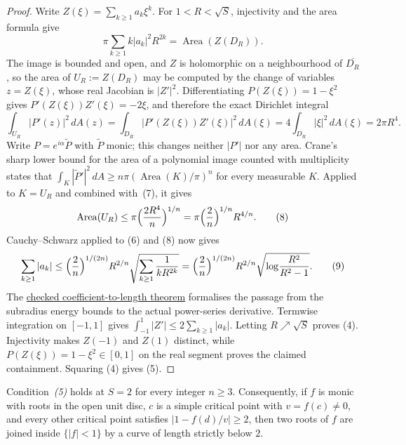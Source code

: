\documentclass[11pt]{article}
\begin{document}
\begin{proof}
Write $Z(\xi)=\sum_{k\ge1}a_k\xi^k$.  For
$1<R<\sqrt S$, injectivity and the area formula give
\[
 \pi\sum_{k\ge1}k|a_k|^2R^{2k}
   =\operatorname{Area}(Z(D_R)).                    \tag{6}
\]
The image is bounded and open, and $Z$ is holomorphic on a neighbourhood of
$\overline{D_R}$, so the area of $U_R:=Z(D_R)$ may be computed by the change
of variables $z=Z(\xi)$, whose real Jacobian is $|Z'|^2$.  Differentiating
$P(Z(\xi))=1-\xi^2$ gives $P'(Z(\xi))Z'(\xi)=-2\xi$, and therefore the exact
Dirichlet integral
\[
 \int_{U_R}|P'(z)|^2\,dA(z)
 =\int_{D_R}\bigl|P'(Z(\xi))Z'(\xi)\bigr|^2\,dA(\xi)
 =4\int_{D_R}|\xi|^2\,dA(\xi)=2\pi R^4.            \tag{7}
\]
Write $P=e^{i\alpha}\widetilde P$ with $\widetilde P$ monic; this changes
neither $|P'|$ nor any area.  Crane's sharp lower bound for the area of a
polynomial image counted with multiplicity \cite[Theorem~3]{crane} states that
$\int_K|\widetilde P'|^2\,dA\ge n\pi(\operatorname{Area}(K)/\pi)^n$ for every
measurable $K$.  Applied to $K=U_R$ and combined with~(7), it gives
\[
 \operatorname{Area}(U_R)
 \le \pi\Bigl(\frac{2R^4}{n}\Bigr)^{1/n}
 = \pi\Bigl(\frac2n\Bigr)^{1/n}R^{4/n}.            \tag{8}
\]
Cauchy--Schwarz applied to (6) and (8) now gives
\[
 \sum_{k\ge1}|a_k|
 \le \Bigl(\frac2n\Bigr)^{1/(2n)}R^{2/n}
      \sqrt{\sum_{k\ge1}\frac1{kR^{2k}}}
 = \Bigl(\frac2n\Bigr)^{1/(2n)}R^{2/n}
   \sqrt{\log\!\frac{R^2}{R^2-1}}.                  \tag{9}
\]
The \href{https://github.com/wcook04/plectis-erdos/blob/0d34630e1cc9d2b1ac6edfa7cfdba83b31bdc8fe/ErdosProblems/Erdos1041/PowerSeriesDerivative.lean#L120}{checked coefficient-to-length theorem} formalises the passage from the subradius energy bounds to the actual power-series derivative. Termwise integration on $[-1,1]$ gives
$\int_{-1}^{1}|Z'|\le2\sum_{k\ge1}|a_k|$.  Letting
$R\nearrow\sqrt S$ proves (4).  Injectivity makes $Z(-1)$ and $Z(1)$
distinct, while $P(Z(\xi))=1-\xi^2\in[0,1]$ on the real segment proves the
claimed containment.  Squaring (4) gives (5).
\end{proof}

\begin{corollary}
\label{res:critical-value-thresholds}
Condition~\emph{(5)} holds at $S=2$ for every integer $n\ge3$.
Consequently, if $f$ is monic with roots in the open unit disc, $c$ is a
simple critical point with $v=f(c)\ne0$, and every other critical point
satisfies $|1-f(d)/v|\ge2$, then two roots of $f$ are joined inside
$\{|f|<1\}$ by a curve of length strictly below $2$.
\end{corollary}
\end{document}
